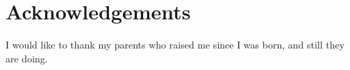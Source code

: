 \chapter*{Acknowledgements}\label{ch:ack}

I would like to thank my parents who raised me since I was born, and still they are doing.



